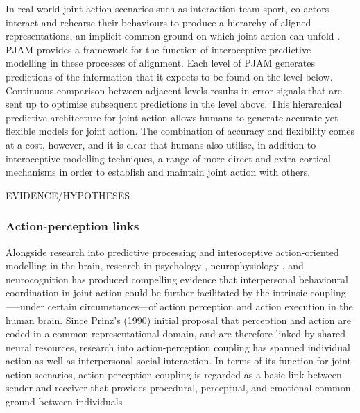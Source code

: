 \begin{CJK}{UTF8}{gbsn}
In real world joint action scenarios such as interaction team sport, co-actors interact and rehearse their behaviours to produce a hierarchy of aligned representations, an implicit common ground on which joint action can unfold \citep{Noy2017}.  PJAM provides a framework for the function of interoceptive predictive modelling in these processes of alignment.  Each level of PJAM generates predictions of the information that it expects to be found on the level below.  Continuous comparison between adjacent levels results in error signals that are sent up to optimise subsequent predictions in the level above.  This hierarchical predictive architecture for joint action allows humans to generate accurate yet flexible models for joint action. The combination of accuracy and flexibility comes at a cost, however, and it is clear that humans also utilise, in addition to interoceptive modelling techniques, a range of more direct and extra-cortical mechanisms in order to establish and maintain joint action with others.

EVIDENCE/HYPOTHESES


\subsubsection{Action-perception links}

Alongside research into predictive processing and interoceptive action-oriented modelling in the brain, research in psychology \citep{Prinz1990,Prinz1997,Prinz2013}, neurophysiology \citep{Rizzolatti2004,Rizzolatti2010}, and neurocognition \citep{Wolpert1998,Wolpert2000} has produced compelling evidence that interpersonal behavioural coordination in joint action could be further facilitated by the intrinsic coupling—--under certain circumstances---of action perception and action execution in the human brain.  Since Prinz’s (1990) initial proposal that perception and action are coded in a common representational domain, and are therefore linked by shared neural resources, research into action-perception coupling has spanned individual action as well as interpersonal social interaction.
In terms of its function for joint action scenarios, action-perception coupling is regarded as a basic link between sender and receiver \citep{Rizzolatti1998} that provides procedural, perceptual, and emotional common ground between individuals \citep{Sebanz2006}


\end{CJK}
